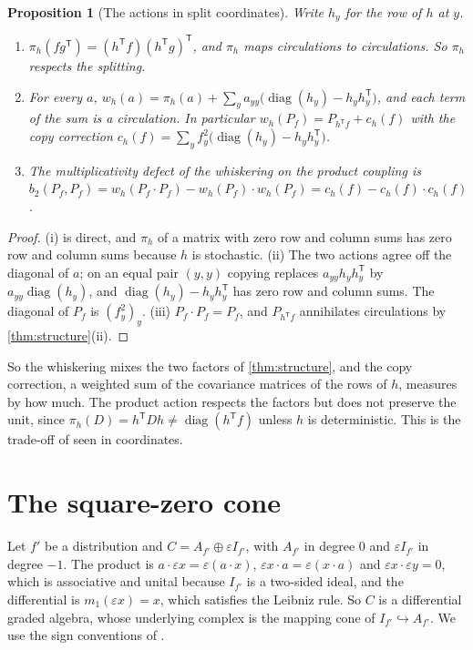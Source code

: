 \documentclass[11pt]{article}
\newtheorem{proposition}[theorem]{Proposition}
\theoremstyle{definition}
\theoremstyle{remark}
\newcommand{\diag}{\operatorname{diag}}
\newcommand{\T}{\mathsf T}
\begin{document}
\begin{proposition}[The actions in split coordinates]\label{prop:actions}
Write $h_y$ for the row of $h$ at $y$.
\begin{enumerate}[label=(\roman*)]
\item $\pi_h(fg^\T)=(h^\T f)(h^\T g)^\T$, and $\pi_h$ maps circulations to circulations. So $\pi_h$ respects the splitting.
\item For every $a$, $w_h(a)=\pi_h(a)+\sum_ya_{yy}\bigl(\diag(h_y)-h_yh_y^\T\bigr)$, and each term of the sum is a circulation.
  In particular $w_h(P_f)=P_{h^\T f}+c_h(f)$ with the \emph{copy correction} $c_h(f)=\sum_yf_y^2\bigl(\diag(h_y)-h_yh_y^\T\bigr)$.
\item The multiplicativity defect of the whiskering on the product coupling is
  $b_2(P_f,P_f)=w_h(P_f\cdot P_f)-w_h(P_f)\cdot w_h(P_f)=c_h(f)-c_h(f)\cdot c_h(f)$.
\end{enumerate}
\end{proposition}
\begin{proof}
(i) is direct, and $\pi_h$ of a matrix with zero row and column sums has zero row and column sums because $h$ is stochastic.
(ii) The two actions agree off the diagonal of $a$; on an equal pair $(y,y)$ copying replaces $a_{yy}h_yh_y^\T$ by
$a_{yy}\diag(h_y)$, and $\diag(h_y)-h_yh_y^\T$ has zero row and column sums. The diagonal of $P_f$ is $(f_y^2)_y$. (iii) $P_f\cdot P_f=P_f$, and $P_{h^\T f}$ annihilates circulations by
\cref{thm:structure}(ii).
\end{proof}

So the whiskering mixes the two factors of \cref{thm:structure}, and the copy correction, a weighted sum of the covariance
matrices of the rows of $h$, measures by how much. The product action respects the factors but does not preserve the unit,
since $\pi_h(D)=h^\T Dh\ne\diag(h^\T f)$ unless $h$ is deterministic. This is the trade-off of \cite[Thm.~10.2]{Conditionals}
seen in coordinates.

\section{The square-zero cone}\label{sec:cone}

Let $f'$ be a distribution and $C=A_{f'}\oplus\varepsilon I_{f'}$, with $A_{f'}$ in degree $0$ and $\varepsilon I_{f'}$ in degree $-1$. The product is
$a\cdot\varepsilon x=\varepsilon(a\cdot x)$, $\varepsilon x\cdot a=\varepsilon(x\cdot a)$ and $\varepsilon x\cdot\varepsilon y=0$, which is associative and unital because $I_{f'}$ is a
two-sided ideal, and the differential is $m_1(\varepsilon x)=x$, which satisfies the Leibniz rule. So $C$ is a differential graded
algebra, whose underlying complex is the mapping cone of $I_{f'}\hookrightarrow A_{f'}$. We use the sign conventions of \cite{Keller2001}.
\end{document}
